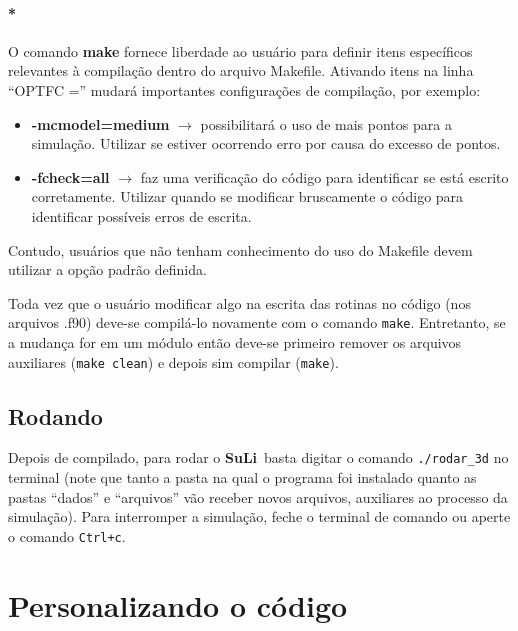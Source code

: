 \documentclass[12pt, a4paper]{article}
\newcommand{\SL}{{\bf SuLi}}
\begin{document}
\paragraph{*}	\label{infosmake}
O comando {\bf{make}} fornece liberdade ao usuário para definir itens específicos relevantes à compilação dentro do arquivo Makefile. Ativando itens na linha ``OPTFC ='' mudará importantes configurações de compilação, por exemplo:
\begin{itemize}


\item\textbf{-mcmodel=medium} $\rightarrow$ possibilitará o uso de mais pontos para a simulação. Utilizar se estiver ocorrendo erro por causa do excesso de pontos.

\item\textbf{-fcheck=all} $\rightarrow$ faz uma verificação do código para identificar se está escrito corretamente. Utilizar quando se modificar bruscamente o código para identificar possíveis erros de escrita.

\end{itemize}
Contudo, usuários que não tenham conhecimento do uso do Makefile devem utilizar a opção padrão definida.

Toda vez que o usuário modificar algo na escrita das rotinas no código (nos arquivos .f90) deve-se compilá-lo novamente com o comando \verb!make!. Entretanto, se a mudança for em um módulo então deve-se primeiro remover os arquivos auxiliares (\verb!make clean!) e depois sim compilar (\verb!make!).

\subsection{Rodando}

Depois de compilado, para rodar o \SL\ basta digitar o comando \verb!./rodar_3d! no terminal (note que tanto a pasta na qual o programa foi instalado quanto as pastas ``dados'' e ``arquivos'' vão receber novos arquivos, auxiliares ao processo da simulação). Para interromper a simulação, feche o terminal de comando ou aperte o comando \verb!Ctrl+c!.


\newpage

\section{Personalizando o código}	\label{utilizando_o_codigo}
\end{document}
